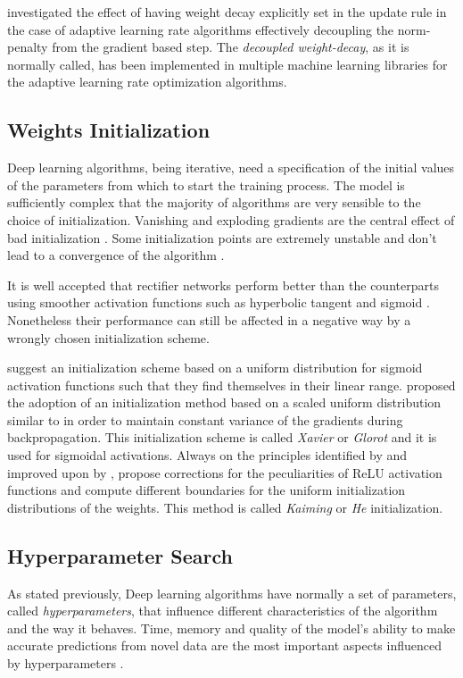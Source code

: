 \citet{Loshchilov2017DecoupledRegularization} investigated the effect of having weight decay explicitly set in the update rule in the case of adaptive learning rate algorithms effectively decoupling the norm-penalty from the gradient based step. The \textit{decoupled weight-decay}, as it is normally called, has been implemented in multiple machine learning libraries for the adaptive learning rate optimization algorithms.

\subsection{Weights Initialization}
Deep learning algorithms, being iterative, need a specification of the initial values of the parameters from which to start the training process. The model is sufficiently complex that the majority of algorithms are very sensible to the choice of initialization. Vanishing and exploding gradients are the central effect of bad initialization \citep{Glorot2010UnderstandingNetworks}. Some initialization points are extremely unstable and don't lead to a convergence of the algorithm \citep{Goodfellow2016}.

It is well accepted that rectifier networks perform better than the counterparts using smoother activation functions such as hyperbolic tangent and sigmoid \citep{Glorot2011DeepNetworks,Glorot2010UnderstandingNetworks}. Nonetheless their performance can still be affected in a negative way by a wrongly chosen initialization scheme. 

\citet{LeCun1998EfficientBackProp} suggest an initialization scheme based on a uniform distribution for sigmoid activation functions such that they find themselves in their linear range. \citet{Glorot2010UnderstandingNetworks} proposed the adoption of an initialization method based on a scaled uniform distribution similar to \citet{LeCun1998EfficientBackProp} in order to maintain constant variance of the gradients during backpropagation. This initialization scheme is called \textit{Xavier} or \textit{Glorot} and it is used for sigmoidal activations. Always on the principles identified by \citet{LeCun1998EfficientBackProp} and improved upon by \citet{Glorot2010UnderstandingNetworks}, \citet{He2015DelvingClassification} propose corrections for the peculiarities of ReLU activation functions and compute different boundaries for the uniform initialization distributions of the weights. This method is called \textit{Kaiming} or \textit{He} initialization.

\subsection{Hyperparameter Search} \label{sec:hyperparametersearch}
As stated previously, Deep learning algorithms have normally a set of parameters, called \textit{hyperparameters}, that influence different characteristics of the algorithm and the way it behaves. Time, memory and quality of the model's ability to make accurate predictions from novel data are the most important aspects influenced by hyperparameters \citep{Goodfellow2016}.

